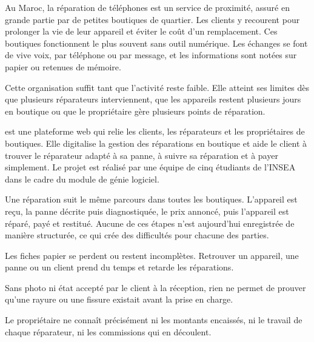 

Au Maroc, la réparation de téléphones est un service de proximité, assuré en grande partie par de petites boutiques de quartier. Les clients y recourent pour prolonger la vie de leur appareil et éviter le coût d’un remplacement. Ces boutiques fonctionnent le plus souvent sans outil numérique. Les échanges se font de vive voix, par téléphone ou par message, et les informations sont notées sur papier ou retenues de mémoire.

Cette organisation suffit tant que l’activité reste faible. Elle atteint ses limites dès que plusieurs réparateurs interviennent, que les appareils restent plusieurs jours en boutique ou que le propriétaire gère plusieurs points de réparation.

\docapp{} est une plateforme web qui relie les clients, les réparateurs et les propriétaires de boutiques. Elle digitalise la gestion des réparations en boutique et aide le client à trouver le réparateur adapté à sa panne, à suivre sa réparation et à payer simplement. Le projet est réalisé par une équipe de cinq étudiants de l’INSEA dans le cadre du module de génie logiciel.


Une réparation suit le même parcours dans toutes les boutiques. L’appareil est reçu, la panne décrite puis diagnostiquée, le prix annoncé, puis l’appareil est réparé, payé et restitué. Aucune de ces étapes n’est aujourd’hui enregistrée de manière structurée, ce qui crée des difficultés pour chacune des parties.


\begin{cdcdefinitions}
  \item[Informations perdues] Les fiches papier se perdent ou restent incomplètes. Retrouver un appareil, une panne ou un client prend du temps et retarde les réparations.
  \item[État initial contesté] Sans photo ni état accepté par le client à la réception, rien ne permet de prouver qu’une rayure ou une fissure existait avant la prise en charge.
  \item[Revenus opaques] Le propriétaire ne connaît précisément ni les montants encaissés, ni le travail de chaque réparateur, ni les commissions qui en découlent.
\end{cdcdefinitions}

